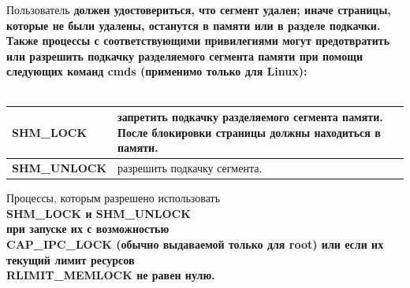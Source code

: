 \documentclass[a4paper]{article}
\begin{document}
Пользователь \bf должен \rm удостовериться, что сегмент удален; иначе страницы, которые не были удалены, останутся в памяти или в разделе подкачки. Также процессы с соответствующими привилегиями могут предотвратить или разрешить подкачку разделяемого сегмента памяти при помощи следующих команд cmds (применимо только для Linux):\\\\
\begin{tabular}{|p{5cm}|p{10cm}|}
  \hline
  \bf SHM\_LOCK & \rm запретить подкачку разделяемого сегмента памяти. После блокировки страницы должны находиться в памяти.\\
  \hline
  \bf SHM\_UNLOCK & \rm разрешить подкачку сегмента.\\
  \hline
\end{tabular}
\vspace{0.5cm}

Процессы, которым разрешено использовать\\\bf SHM\_LOCK \rm и \bf SHM\_UNLOCK \\\rm при запуске их с возможностью \\\bf CAP\_IPC\_LOCK \rm (обычно выдаваемой только для \bf root) \rm или если их текущий лимит ресурсов \\\bf RLIMIT\_MEMLOCK \rm не равен нулю.

\newpage
\end{document}
